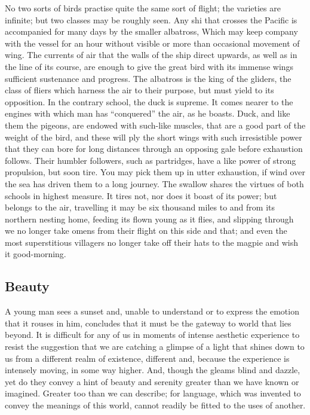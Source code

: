 \documentclass[11pt]{article}
\begin{document}
No two sorts of birds practise quite the same sort of flight; the varieties are infinite; but two classes may be roughly seen. Any shi that crosses the Pacific is accompanied for many days by the smaller albatross, Which may keep company with the vessel for an hour without visible or more than occasional movement of wing. The currents of air that the walls of the ship direct upwards, as well as in the line of its course, are enough to give the great bird with its immense wings sufficient sustenance and progress. The albatross is the king of the gliders, the class of fliers which harness the air to their purpose, but must yield to its opposition. In the contrary school, the duck is supreme. It comes nearer to the engines with which man has ``conquered'' the air, as he boasts. Duck, and like them the pigeons, are endowed with such-like muscles, that are a good part of the weight of the bird, and these will ply the short wings with such irresistible power that they can bore for long distances through an opposing gale before exhaustion follows. Their humbler followers, such as partridges, have a like power of strong propulsion, but soon tire. You may pick them up in utter exhaustion, if wind over the sea has driven them to a long journey. The swallow shares the virtues of both schools in highest measure. It tires not, nor does it boast of its power; but belongs to the air, travelling it may be six thousand miles to and from its northern nesting home, feeding its flown young as it flies, and slipping through we no longer take omens from their flight on this side and that; and even the most superstitious villagers no longer take off their hats to the magpie and wish it good-morning.
\subsection{Beauty}
\label{sec-2-24}

A young man sees a sunset and, unable to understand or to express the emotion that it rouses in him, concludes that it must be the gateway to world that lies beyond. It is difficult for any of us in moments of intense aesthetic experience to resist the suggestion that we are catching a glimpse of a light that shines down to us from a different realm of existence, different and, because the experience is intensely moving, in some way higher. And, though the gleams blind and dazzle, yet do they convey a hint of beauty and serenity greater than we have known or imagined. Greater too than we can describe; for language, which was invented to convey the meanings of this world, cannot readily be fitted to the uses of another.
\end{document}
